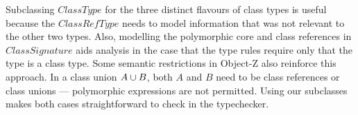 Subclassing $ClassType$ for the three distinct flavours of class types
is useful because the $ClassRefType$ needs to model information that
was not relevant to the other two types. Also, modelling the
polymorphic core and class references in $ClassSignature$ aids
analysis in the case that the type rules require only that the type is
a class type. Some semantic restrictions in Object-Z also reinforce
this approach. In a class union $A \classuni B$, both $A$ and $B$ need
to be class references or class unions --- polymorphic expressions are
not permitted. Using our subclasses makes both cases straightforward
to check in the typechecker.



